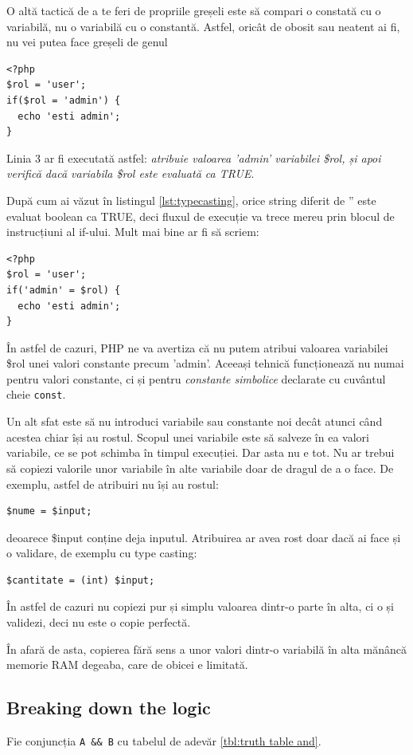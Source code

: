 O altă tactică de a te feri de propriile greșeli este să compari o constată
cu o variabilă, nu o variabilă cu o constantă. Astfel, oricât de obosit
sau neatent ai fi, nu vei putea face greșeli de genul
\begin{lstlisting}
<?php
$rol = 'user';
if($rol = 'admin') {
  echo 'esti admin';
}
\end{lstlisting}
Linia 3 ar fi executată astfel: \textit{atribuie valoarea 'admin' variabilei
\$rol, și apoi verifică dacă variabila \$rol este evaluată ca TRUE}.

După cum ai văzut în listingul \ref{lst:typecasting}, orice string diferit
de '' este evaluat boolean ca TRUE, deci fluxul de execuție va trece mereu
prin blocul de instrucțiuni al if-ului. Mult mai bine ar fi să scriem:
\begin{lstlisting}
<?php
$rol = 'user';
if('admin' = $rol) {
  echo 'esti admin';
}
\end{lstlisting}
În astfel de cazuri, PHP ne va avertiza că nu putem atribui valoarea variabilei
\$rol unei valori constante precum 'admin'. Aceeași tehnică funcționează nu numai
pentru valori constante, ci și pentru \textsl{constante simbolice} declarate cu cuvântul
cheie \texttt{const}.

Un alt sfat este să nu introduci variabile sau constante noi decât atunci când
acestea chiar își au rostul. Scopul unei variabile este să salveze în ea
valori variabile, ce se pot schimba în timpul execuției. Dar asta nu e tot.
Nu ar trebui să copiezi valorile unor variabile în alte variabile doar
de dragul de a o face. De exemplu, astfel de atribuiri nu își au rostul:
\begin{lstlisting}
$nume = $input;
\end{lstlisting}
deoarece \$input conține deja inputul. Atribuirea ar avea rost doar dacă ai face
și o validare, de exemplu cu type casting:
\begin{lstlisting}
$cantitate = (int) $input;
\end{lstlisting}
În astfel de cazuri nu copiezi pur și simplu valoarea dintr-o parte în alta, ci
o și validezi, deci nu este o {\glqq}copie perfectă{\grqq}.

În afară de asta, copierea fără sens a unor valori dintr-o variabilă în alta mănâncă
memorie RAM degeaba, care de obicei e limitată.

\subsection{Breaking down the logic}
Fie conjuncția \texttt{A \&\& B} cu tabelul de adevăr \ref{tbl:truth table and}.

